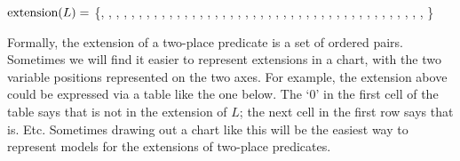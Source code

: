 $\mbox{extension}(L)=$ \{, , , , , , , , ,
, , , , , , , ,
, , , , , , ,
, , , , , ,
, , , , ,
, , , , 
, , ,
, 
%
\}

Formally, the extension of a two-place predicate is a set of ordered pairs. Sometimes we will find it easier to represent extensions in a chart, with the two variable positions represented on the two axes. For example, the extension above could be expressed via a table like the one below. The `0' in the first cell of the table says that  is not in the extension of $L$; the next cell in the first row says that  is. Etc. Sometimes drawing out a chart like this will be the easiest way to represent models for the extensions of two-place predicates.




